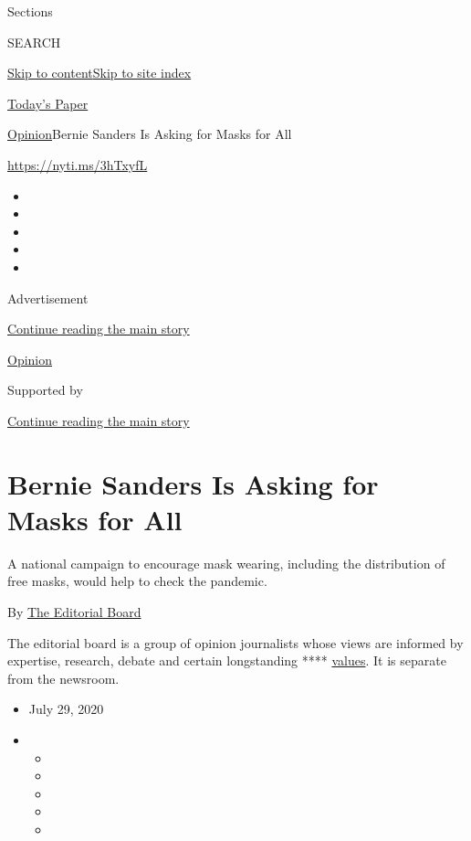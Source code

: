 Sections

SEARCH

\protect\hyperlink{site-content}{Skip to
content}\protect\hyperlink{site-index}{Skip to site index}

\href{https://myaccount.nytimes3xbfgragh.onion/auth/login?response_type=cookie\&client_id=vi}{}

\href{https://www.nytimes3xbfgragh.onion/section/todayspaper}{Today's
Paper}

\href{/section/opinion}{Opinion}\textbar{}Bernie Sanders Is Asking for
Masks for All

\url{https://nyti.ms/3hTxyfL}

\begin{itemize}
\item
\item
\item
\item
\item
\end{itemize}

Advertisement

\protect\hyperlink{after-top}{Continue reading the main story}

\href{/section/opinion}{Opinion}

Supported by

\protect\hyperlink{after-sponsor}{Continue reading the main story}

\hypertarget{bernie-sanders-is-asking-for-masks-for-all}{%
\section{Bernie Sanders Is Asking for Masks for
All}\label{bernie-sanders-is-asking-for-masks-for-all}}

A national campaign to encourage mask wearing, including the
distribution of free masks, would help to check the pandemic.

By
\href{https://www.nytimes3xbfgragh.onion/interactive/opinion/editorialboard.html}{The
Editorial Board}

The editorial board is a group of opinion journalists whose views are
informed by expertise, research, debate and certain longstanding ****
\href{https://www.nytimes3xbfgragh.onion/interactive/2018/opinion/editorialboard.html}{values}.
It is separate from the newsroom.

\begin{itemize}
\item
  July 29, 2020
\item
  \begin{itemize}
  \item
  \item
  \item
  \item
  \item
  \end{itemize}
\end{itemize}

